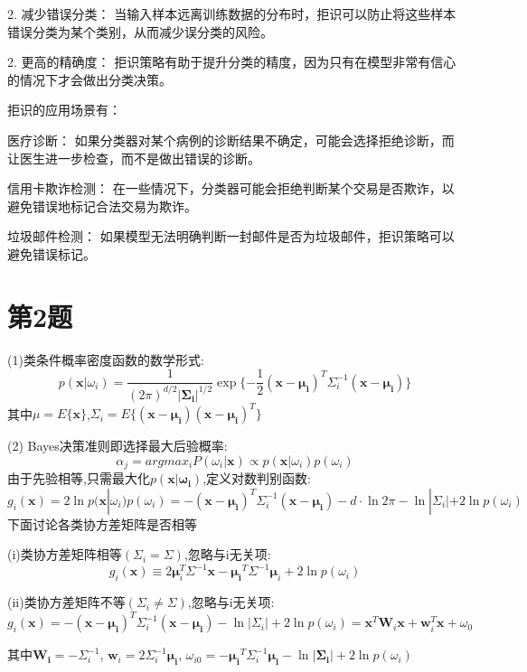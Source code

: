 \documentclass{article}
\begin{document}
2. 减少错误分类： 当输入样本远离训练数据的分布时，拒识可以防止将这些样本错误分类为某个类别，从而减少误分类的风险。

2. 更高的精确度： 拒识策略有助于提升分类的精度，因为只有在模型非常有信心的情况下才会做出分类决策。

拒识的应用场景有：

医疗诊断： 如果分类器对某个病例的诊断结果不确定，可能会选择拒绝诊断，而让医生进一步检查，而不是做出错误的诊断。

信用卡欺诈检测： 在一些情况下，分类器可能会拒绝判断某个交易是否欺诈，以避免错误地标记合法交易为欺诈。

垃圾邮件检测： 如果模型无法明确判断一封邮件是否为垃圾邮件，拒识策略可以避免错误标记。

\section*{第2题}

(1)类条件概率密度函数的数学形式:
\[p(\boldsymbol{x}|\omega_i)=\frac{1}{(2\pi)^{d/2}|\boldsymbol{\Sigma_i}|^{1/2}}\exp\{-\frac{1}{2}(\boldsymbol{x}-\boldsymbol{\mu_i})^T\Sigma_i^{-1}(\boldsymbol{x}-\boldsymbol{\mu_i})\}\]
其中$\mu=E\{\boldsymbol{x}\}$,$\Sigma_i=E\{(\boldsymbol{x}-\boldsymbol{\mu_i})(\boldsymbol{x}-\boldsymbol{\mu_i})^T\}$

(2)
Bayes决策准则即选择最大后验概率:
\[\alpha_j=argmax_{i} P(\omega_i|\boldsymbol{x})\propto p(\boldsymbol{x}|\omega_i)p(\omega_i)\]
由于先验相等,只需最大化$p(\boldsymbol{x|\omega_i})$,定义对数判别函数:
\[g_i(\boldsymbol{x})=2\ln p(\boldsymbol{x}|\omega_i)p(\omega_i)=-(\boldsymbol{x}-\boldsymbol{\mu_i})^T\Sigma_i^{-1}(\boldsymbol{x}-\boldsymbol{\mu_i})-d\cdot \ln2\pi-\ln|\Sigma_i|+2\ln p(\omega_i)\]下面讨论各类协方差矩阵是否相等

(i)类协方差矩阵相等$(\Sigma_i=\Sigma)$,忽略与i无关项:
\[g_i(\boldsymbol{x})\equiv 2\boldsymbol{\mu}_i^T\Sigma^{-1}\boldsymbol{x}-\boldsymbol{\mu_i}^T\Sigma^{-1}\boldsymbol{\mu}_i+2\ln p(\omega_i)\]

(ii)类协方差矩阵不等$(\Sigma_i\neq\Sigma)$,忽略与i无关项:
\[g_i(\boldsymbol{x})=-(\boldsymbol{x}-\boldsymbol{\mu_i})^T\Sigma_i^{-1}(\boldsymbol{x}-\boldsymbol{\mu_i})-\ln|\Sigma_i|+2\ln p(\omega_i)=\boldsymbol{x}^T\boldsymbol{W}_i\boldsymbol{x}+\boldsymbol{w}_i^T\boldsymbol{x}+\omega_0\]

其中$\boldsymbol{W_i}=-\Sigma_i^{-1}$, $\boldsymbol{w}_i=2\Sigma_i^{-1}\boldsymbol{\mu_i}$, $\omega_{i0}=-\boldsymbol{\mu_i}^T\Sigma_i^{-1}\boldsymbol{\mu_i}-\ln|\boldsymbol{\Sigma_i}|+2\ln p(\omega_i)$
\end{document}

